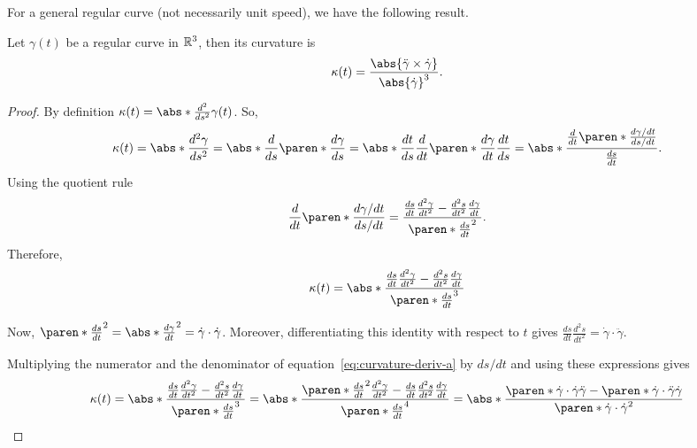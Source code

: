 \documentclass[11pt]{penrose}
\begin{document}
For a general regular curve (not necessarily unit speed), we have the following result.
\begin{nprop}
    Let $\gamma(t)$ be a regular curve in $\mathbb{R}^3$, then its curvature is
    \begin{equation}
        \kappa(t) = \frac{\abs{ \ddot{\gamma} \times \dot{\gamma} }}{ \abs{\dot{\gamma}}^3 }.
        \label{eq:curvature-general}
    \end{equation}
\end{nprop}
\begin{proof}
    By definition $\kappa(t) = \abs*{ \frac{d^2}{ds^2} \gamma(t) }$. So,
    \begin{equation}
        \kappa(t)
        = \abs*{ \frac{d^2 \gamma}{ds^2} }
        = \abs*{ \frac{d}{ds} \paren*{\frac{d\gamma}{ds}} }
        = \abs*{ \frac{dt}{ds} \frac{d}{dt} \paren*{\frac{d\gamma}{dt} \frac{dt}{ds}} }
        = \abs*{ \frac{\frac{d}{dt} \paren*{ \frac{ d\gamma/dt }{ ds/dt } }}{\frac{ds}{dt}} }.
    \end{equation}
    Using the quotient rule
    \begin{equation}
        \frac{d}{dt} \paren*{ \frac{ d\gamma/dt }{ ds/dt } }
        = \dfrac{ \frac{ds}{dt} \frac{d^2 \gamma}{dt^2} - \frac{d^2 s}{dt^2} \frac{d\gamma}{dt} }{ \paren*{\frac{ds}{dt}}^2 }.
    \end{equation}
    Therefore,
    \begin{equation}
        \kappa(t)
        = \abs*{ \dfrac{ \frac{ds}{dt} \frac{d^2 \gamma}{dt^2} - \frac{d^2 s}{dt^2} \frac{d\gamma}{dt} }{ \paren*{\frac{ds}{dt}}^3 } }
        \label{eq:curvature-deriv-a}
    \end{equation}

    Now, $\paren*{\frac{ds}{dt}}^2 = \abs*{ \frac{d\gamma}{dt} }^2 = \dot{\gamma} \cdot \dot{\gamma}$. Moreover, differentiating this identity with respect to $t$ gives $\frac{ds}{dt} \frac{d^2 s}{dt^2} = \dot{\gamma} \cdot \ddot{\gamma}$.

    Multiplying the numerator and the denominator of equation~\eqref{eq:curvature-deriv-a} by $ds/dt$ and using these expressions gives
    \begin{equation}
        \kappa(t)
        = \abs*{ \dfrac{ \frac{ds}{dt} \frac{d^2 \gamma}{dt^2} - \frac{d^2 s}{dt^2} \frac{d\gamma}{dt} }{ \paren*{\frac{ds}{dt}}^3 } }
        = \abs*{ \dfrac{ \paren*{\frac{ds}{dt}}^2 \frac{d^2 \gamma}{dt^2} - \frac{ds}{dt} \frac{d^2 s}{dt^2} \frac{d\gamma}{dt} }{ \paren*{\frac{ds}{dt}}^4 } }
        = \abs*{ \dfrac{ \paren*{\dot{\gamma} \cdot \dot{\gamma}} \ddot{\gamma} - \paren*{\dot{\gamma} \cdot \ddot{\gamma}} \dot{\gamma} }{ \paren*{\dot{\gamma} \cdot \dot{\gamma}}^2 } }
    \end{equation}


\end{proof}
\end{document}
